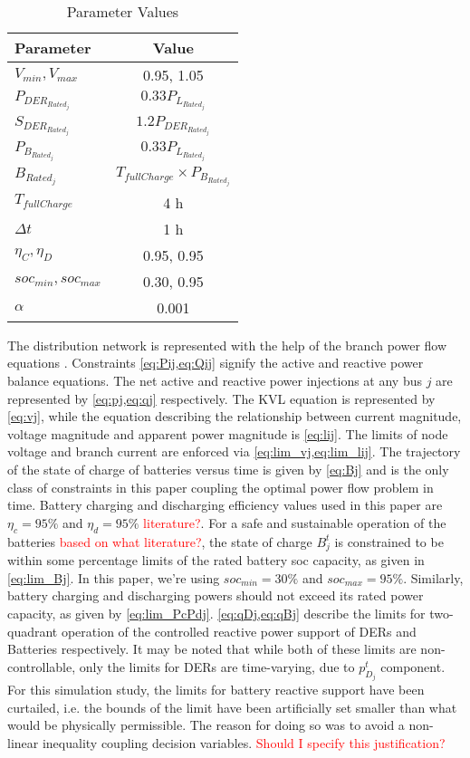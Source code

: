 \documentclass[../../outputs/main.tex]{subfiles}
\begin{document}
\begin{table}[h!]
    \centering
    \caption{Parameter Values}
    \begin{tabular}{|l|c|}
    \hline
    \textbf{Parameter} & \textbf{Value} \\ \hline
    $V_{min}, V_{max}$ & 0.95, 1.05 \\ \hline
    $P_{DER_{Rated_j}}$ & $0.33 P_{L_{Rated_j}}$ \\ \hline
    $S_{DER_{Rated_j}}$ & $1.2 P_{DER_{Rated_j}}$ \\ \hline
    $P_{B_{Rated_j}}$ & $0.33 P_{L_{Rated_j}}$ \\ \hline
    $B_{Rated_j}$ & $T_{fullCharge} \times P_{B_{Rated_j}}$ \\ \hline
    $T_{fullCharge}$ & 4 h \\ \hline
    $\Delta t$ & 1 h \\ \hline
    $\eta_C, \eta_D$ & 0.95, 0.95 \\ \hline
    $soc_{min}, soc_{max}$ & 0.30, 0.95 \\ \hline
    $\alpha$ & 0.001 \\ \hline
    \end{tabular}
    \label{table:parameter-values}
\end{table}

The distribution network is represented with the help of the branch power flow equations . Constraints \cref{eq:Pij,eq:Qij} signify the active and reactive power balance equations. The net active and reactive power injections at any bus \(j\) are represented by \cref{eq:pj,eq:qj} respectively. The KVL equation is represented by \cref{eq:vj}, while the equation describing the relationship between current magnitude, voltage magnitude and apparent power magnitude is \cref{eq:lij}. The limits of node voltage and branch current are enforced via \cref{eq:lim_vj,eq:lim_lij}. The trajectory of the state of charge of batteries versus time is given by \cref{eq:Bj} and is the only class of constraints in this paper coupling the optimal power flow problem in time. Battery charging and discharging efficiency values used in this paper are $\eta_c = 95\%$ and $\eta_d = 95\%$ \textcolor{red}{literature?}. For a safe and sustainable operation of the batteries \textcolor{red}{based on what literature?}, the state of charge $B^{t}_{j}$ is constrained to be within some percentage limits of the rated battery soc capacity, as given in \cref{eq:lim_Bj}. In this paper, we're using $soc_{min} = 30\%$ and $soc_{max} = 95\%$. Similarly, battery charging and discharging powers should not exceed its rated power capacity, as given by \cref{eq:lim_PcPdj}.  \cref{eq:qDj,eq:qBj} describe the limits for two-quadrant operation of the controlled reactive power support of DERs and Batteries respectively. It may be noted that while both of these limits are non-controllable, only the limits for DERs are time-varying, due to $p^{t}_{D_j}$ component. For this simulation study, the limits for battery reactive support have been curtailed, i.e. the bounds of the limit have been artificially set smaller than what would be physically permissible. The reason for doing so was to avoid a non-linear inequality coupling decision variables. \textcolor{red}{Should I specify this justification?}
\end{document}
